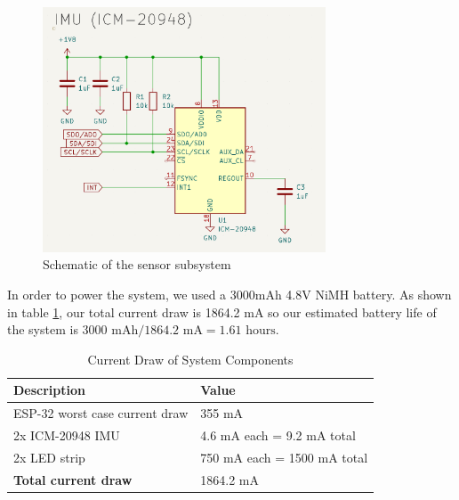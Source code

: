 \begin{figure}[ht]
    \centering
    \includegraphics[width=0.75\textwidth]{images/IMU_schematic.png}
    \caption{Schematic of the sensor subsystem}
    \label{fig:IMU_sub}
\end{figure}
In order to power the system, we used a 3000mAh 4.8V NiMH battery. As shown in table \ref{tab:current_draw}, our total current draw is 1864.2 mA so our estimated battery life of the system is $3000 \text{ mAh} / 1864.2 \text{ mA} = 1.61 \text{ hours}$. 
\begin{table}[h]
    \centering
    \caption{Current Draw of System Components}
    \label{tab:current_draw}
    \begin{tabular}{|l|l|}
        \hline
        \textbf{Description} & \textbf{Value} \\
        \hline
        ESP-32 worst case current draw & 355 mA \\
        \hline
        2x ICM-20948 IMU & 4.6 mA each = 9.2 mA total \\
        \hline
        2x LED strip & 750 mA each = 1500 mA total \\
        \hline
        \textbf{Total current draw} & 1864.2 mA \\
        \hline
    \end{tabular}
\end{table}


